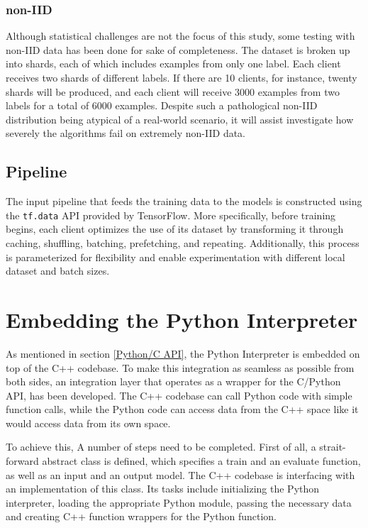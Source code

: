 \subsubsection{non-IID}
Although statistical challenges are not the focus of this study, some testing with non-IID data has been done for sake of completeness. The dataset is broken up into shards, each of which includes examples from only one label. Each client receives two shards of different labels. If there are 10 clients, for instance, twenty shards will be produced, and each client will receive 3000 examples from two labels for a total of 6000 examples. Despite such a pathological non-IID distribution being atypical of a real-world scenario, it will assist investigate how severely the algorithms fail on extremely non-IID data.

\subsection{Pipeline}
The input pipeline that feeds the training data to the models is constructed using the \texttt{tf.data} API provided by TensorFlow. More specifically, before training begins, each client optimizes the use of its dataset by transforming it through caching, shuffling, batching, prefetching, and repeating. Additionally, this process is parameterized for flexibility and enable experimentation with different local dataset and batch sizes.

\section{Embedding the Python Interpreter}
As mentioned in section \ref{Python/C API}, the Python Interpreter is embedded on top of the C++ codebase. To make this integration as seamless as possible from both sides, an integration layer that operates as a wrapper for the C/Python API, has been developed. The C++ codebase can call Python code with simple function calls, while the Python code can access data from the C++ space like it would access data from its own space.

To achieve this, A number of steps need to be completed. First of all, a strait-forward abstract class is defined, which specifies a train and an evaluate function, as well as an input and an output model. The C++ codebase is interfacing with an implementation of this class. Its tasks include initializing the Python interpreter, loading the appropriate Python module, passing the necessary data and creating C++ function wrappers for the Python function.

